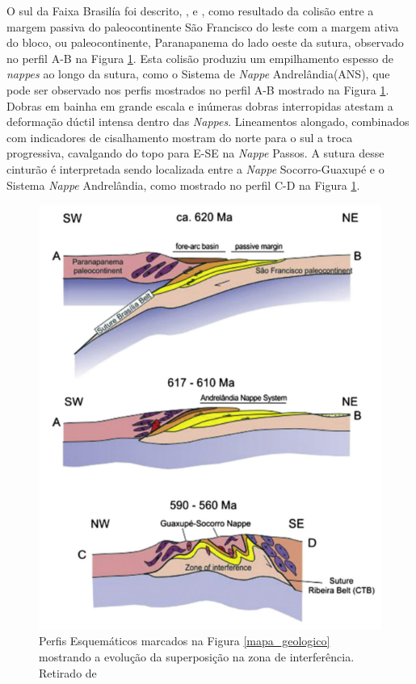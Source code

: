 O sul da Faixa Brasilía foi descrito, \cite{pimentel_tectonic_2011},\cite{reno_situ_2012} e \cite{trouw_new_2013}, como resultado da colisão entre a margem passiva do paleocontinente São Francisco do leste com a margem ativa do bloco, ou paleocontinente, Paranapanema do lado oeste da sutura, observado no perfil A-B na Figura \ref{perfil_esquematico}. Esta colisão produziu um empilhamento espesso de \textit{nappes} ao longo da sutura, como o Sistema de \textit{Nappe} Andrelândia(ANS), que pode ser observado nos perfis mostrados no perfil A-B mostrado na Figura \ref{perfil_esquematico}. Dobras em bainha em grande escala e inúmeras dobras interropidas atestam a deformação dúctil intensa dentro das \textit{Nappes}. Lineamentos alongado, combinados com indicadores de cisalhamento mostram do norte para o sul a troca progressiva, cavalgando do topo para E-SE  na \textit{Nappe} Passos. A sutura desse cinturão é interpretada sendo localizada entre a \textit{Nappe} Socorro-Guaxupé e o Sistema \textit{Nappe} Andrelândia, como mostrado no perfil C-D na Figura \ref{perfil_esquematico}.

\begin{figure}[!ht]
\centering
\includegraphics[scale=0.5]{Figs/perfil_esquematico_area.png}
\caption[Perfis Esquemáticos da Região do Sudeste do Brasil segundo  \cite{trouw_new_2013}.]{Perfis Esquemáticos marcados na Figura \ref{mapa_geologico} mostrando a evolução da superposição na zona de interferência. Retirado de \cite{trouw_new_2013}}
\label{perfil_esquematico}
\end{figure} 


